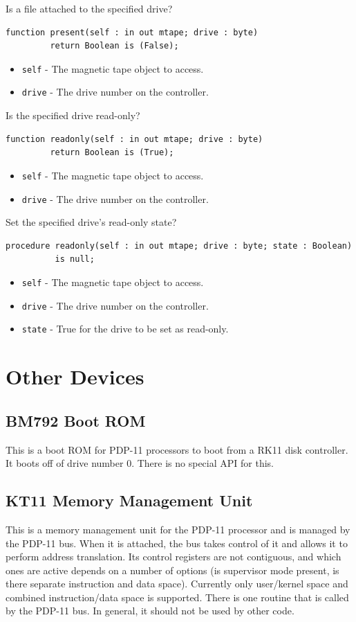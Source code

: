 \documentclass[10pt, openany]{book}
\newcommand{\keyword}[1]{\texttt{#1}}
\begin{document}
Is a file attached to the specified drive?
\begin{lstlisting}
function present(self : in out mtape; drive : byte)
         return Boolean is (False);
\end{lstlisting}
\begin{itemize}
  \item \keyword{self} - The magnetic tape object to access.
  \item \keyword{drive} - The drive number on the controller.
\end{itemize}

Is the specified drive read-only?
\begin{lstlisting}
function readonly(self : in out mtape; drive : byte)
         return Boolean is (True);
\end{lstlisting}
\begin{itemize}
  \item \keyword{self} - The magnetic tape object to access.
  \item \keyword{drive} - The drive number on the controller.
\end{itemize}

Set the specified drive's read-only state?
\begin{lstlisting}
procedure readonly(self : in out mtape; drive : byte; state : Boolean)
          is null;
\end{lstlisting}
\begin{itemize}
  \item \keyword{self} - The magnetic tape object to access.
  \item \keyword{drive} - The drive number on the controller.
  \item \keyword{state} - True for the drive to be set as read-only.
\end{itemize}

\section{Other Devices}
\subsection{BM792 Boot ROM}
This is a boot ROM for PDP-11 processors to boot from a RK11 disk controller.
It boots off of drive number 0.
There is no special API for this.

\subsection{KT11 Memory Management Unit}
This is a memory management unit for the PDP-11 processor and is managed by the PDP-11 bus.
When it is attached, the bus takes control of it and allows it to perform address translation.
Its control registers are not contiguous, and which ones are active depends on a number of options (is supervisor mode present, is there separate instruction and data space).
Currently only user/kernel space and combined instruction/data space is supported.
There is one routine that is called by the PDP-11 bus.
In general, it should not be used by other code.
\end{document}
